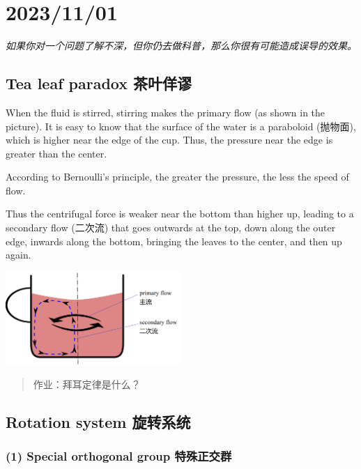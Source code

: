\chapter{2023/11/01}\label{20231101}

\emph{如果你对一个问题了解不深，但你仍去做科普，那么你很有可能造成误导的效果。}

\section{Tea leaf paradox
茶叶佯谬}\label{tea-leaf-paradox-ux8336ux53f6ux4f6fux8c2c}

When the fluid is stirred, stirring makes the primary flow (as shown in
the picture). It is easy to know that the surface of the water is a
paraboloid (抛物面), which is higher near the edge of the cup. Thus, the
pressure near the edge is greater than the center.

According to Bernoulli's principle, the greater the pressure, the less
the speed of flow.

Thus the centrifugal force is weaker near the bottom than higher up,
leading to a secondary flow (二次流) that goes outwards at the top, down
along the outer edge, inwards along the bottom, bringing the leaves to
the center, and then up again.

\begin{center}
    \includegraphics[height=100pt]{assets/Tea_leaf_paradox.png}
\end{center}

\begin{quote}
作业：拜耳定律是什么？
\end{quote}

\section{Rotation system
旋转系统}\label{rotation-system-ux65cbux8f6cux7cfbux7edf}

\subsection*{(1) Special orthogonal group
特殊正交群}\label{special-orthogonal-group-ux7279ux6b8aux6b63ux4ea4ux7fa4}

